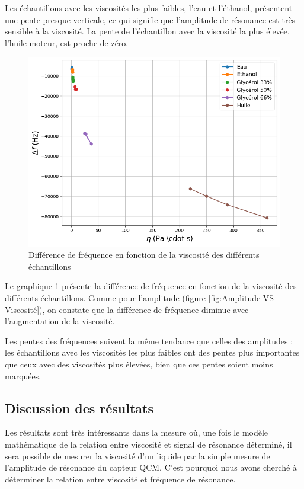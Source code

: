 Les échantillons avec les viscosités les plus faibles, l'eau et l'éthanol, présentent une pente presque verticale, ce qui signifie que l'amplitude de résonance est très sensible à la viscosité.  
La pente de l'échantillon avec la viscosité la plus élevée, l'huile moteur, est proche de zéro.
\newpage
\begin{figure}[H]
    \centering
    \includegraphics[width=\textwidth]{assets/figures/frequency-viscosity.png}
    \caption{Différence de fréquence en fonction de la viscosité des différents échantillons}
    \label{fig:Frequence VS Viscosité}
\end{figure}

Le graphique \ref{fig:Frequence VS Viscosité} présente la différence de fréquence en fonction de la viscosité des différents échantillons.  
Comme pour l'amplitude (figure \ref{fig:Amplitude VS Viscosité}), on constate que la différence de fréquence diminue avec l'augmentation de la viscosité.

Les pentes des fréquences suivent la même tendance que celles des amplitudes : les échantillons avec les viscosités les plus faibles ont des pentes plus importantes que ceux avec des viscosités plus élevées, bien que ces pentes soient moins marquées.
\newpage
\subsection{Discussion des résultats}

Les résultats sont très intéressants dans la mesure où, une fois le modèle mathématique de la relation entre viscosité et signal de résonance déterminé, il sera possible de mesurer la viscosité d’un liquide par la simple mesure de l’amplitude de résonance du capteur QCM.  
C’est pourquoi nous avons cherché à déterminer la relation entre viscosité et fréquence de résonance.

